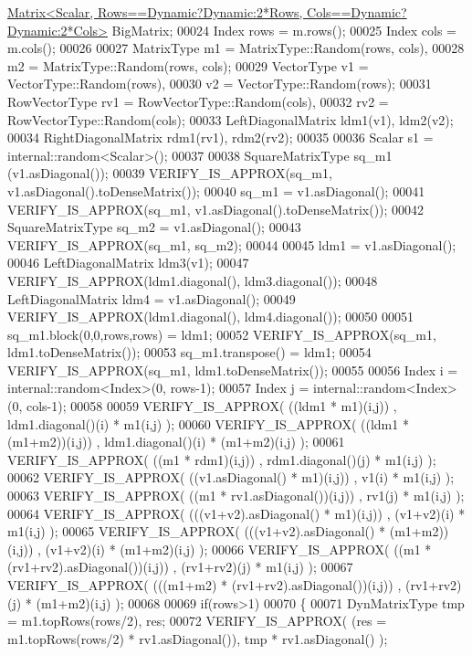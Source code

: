 \begin{DoxyCode}
      \hyperlink{group___core___module_class_eigen_1_1_matrix}{Matrix<Scalar, Rows==Dynamic?Dynamic:2*Rows, Cols==Dynamic?Dynamic:2*Cols>}
       BigMatrix;
00024   Index rows = m.rows();
00025   Index cols = m.cols();
00026 
00027   MatrixType m1 = MatrixType::Random(rows, cols),
00028              m2 = MatrixType::Random(rows, cols);
00029   VectorType v1 = VectorType::Random(rows),
00030              v2 = VectorType::Random(rows);
00031   RowVectorType rv1 = RowVectorType::Random(cols),
00032              rv2 = RowVectorType::Random(cols);
00033   LeftDiagonalMatrix ldm1(v1), ldm2(v2);
00034   RightDiagonalMatrix rdm1(rv1), rdm2(rv2);
00035   
00036   Scalar s1 = internal::random<Scalar>();
00037 
00038   SquareMatrixType sq\_m1 (v1.asDiagonal());
00039   VERIFY\_IS\_APPROX(sq\_m1, v1.asDiagonal().toDenseMatrix());
00040   sq\_m1 = v1.asDiagonal();
00041   VERIFY\_IS\_APPROX(sq\_m1, v1.asDiagonal().toDenseMatrix());
00042   SquareMatrixType sq\_m2 = v1.asDiagonal();
00043   VERIFY\_IS\_APPROX(sq\_m1, sq\_m2);
00044   
00045   ldm1 = v1.asDiagonal();
00046   LeftDiagonalMatrix ldm3(v1);
00047   VERIFY\_IS\_APPROX(ldm1.diagonal(), ldm3.diagonal());
00048   LeftDiagonalMatrix ldm4 = v1.asDiagonal();
00049   VERIFY\_IS\_APPROX(ldm1.diagonal(), ldm4.diagonal());
00050   
00051   sq\_m1.block(0,0,rows,rows) = ldm1;
00052   VERIFY\_IS\_APPROX(sq\_m1, ldm1.toDenseMatrix());
00053   sq\_m1.transpose() = ldm1;
00054   VERIFY\_IS\_APPROX(sq\_m1, ldm1.toDenseMatrix());
00055   
00056   Index i = internal::random<Index>(0, rows-1);
00057   Index j = internal::random<Index>(0, cols-1);
00058   
00059   VERIFY\_IS\_APPROX( ((ldm1 * m1)(i,j))  , ldm1.diagonal()(i) * m1(i,j) );
00060   VERIFY\_IS\_APPROX( ((ldm1 * (m1+m2))(i,j))  , ldm1.diagonal()(i) * (m1+m2)(i,j) );
00061   VERIFY\_IS\_APPROX( ((m1 * rdm1)(i,j))  , rdm1.diagonal()(j) * m1(i,j) );
00062   VERIFY\_IS\_APPROX( ((v1.asDiagonal() * m1)(i,j))  , v1(i) * m1(i,j) );
00063   VERIFY\_IS\_APPROX( ((m1 * rv1.asDiagonal())(i,j))  , rv1(j) * m1(i,j) );
00064   VERIFY\_IS\_APPROX( (((v1+v2).asDiagonal() * m1)(i,j))  , (v1+v2)(i) * m1(i,j) );
00065   VERIFY\_IS\_APPROX( (((v1+v2).asDiagonal() * (m1+m2))(i,j))  , (v1+v2)(i) * (m1+m2)(i,j) );
00066   VERIFY\_IS\_APPROX( ((m1 * (rv1+rv2).asDiagonal())(i,j))  , (rv1+rv2)(j) * m1(i,j) );
00067   VERIFY\_IS\_APPROX( (((m1+m2) * (rv1+rv2).asDiagonal())(i,j))  , (rv1+rv2)(j) * (m1+m2)(i,j) );
00068   
00069   \textcolor{keywordflow}{if}(rows>1)
00070   \{
00071     DynMatrixType tmp = m1.topRows(rows/2), res;
00072     VERIFY\_IS\_APPROX( (res = m1.topRows(rows/2) * rv1.asDiagonal()), tmp * rv1.asDiagonal() );

\end{DoxyCode}

